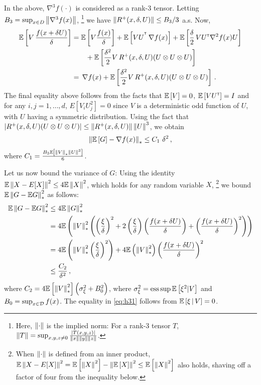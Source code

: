 In the above, $\nabla^3 f(\cdot)$ is considered as a rank-3 tensor.
Letting $B_3 = \sup_{x\in D} \left\| \nabla^3 f(x) \right\|$,%
\footnote{Here, $\left\|\cdot\right\|$ is the implied norm: For a rank-3 tensor $T$, $\left\|T\right\| = \sup_{x,y,z\ne 0}
\frac{|T (x,y,z)|}{\left\|x\right\|\left\|y\right\|\left\|z\right\|}$.
}
we have $\left\| R^{+}(x,\delta,U)\right\| \le B_3/3$ a.s.
Now,
\begin{align*}
\mathbb{E}\left[V\, \dfrac{f(x+\delta U)}{\delta}\right]
&= \mathbb{E}\left[V \frac{f(x)}{\delta}\right] +  \mathbb{E}\left[VU^{^\mathsf{\scriptscriptstyle T}}
\, \nabla f(x)\right]  + \mathbb{E}\left[\frac{\delta}{2}\, V U^\mathsf{\scriptscriptstyle T} \nabla^2 f(x) U\right] \\
&\qquad+   \mathbb{E}\left[\frac{\delta^2}{2}  V \,R^{+}(x,\delta,U)(U \otimes U \otimes U)\right]
\\
&= \, \nabla f(x)  + \mathbb{E}\left[\frac{\delta^2}{2}  V \,R^{+}(x,\delta,U)(U \otimes U \otimes U)\right]\,.
\end{align*}
The final equality above follows from the facts that $\mathbb{E}\left[V\right] = 0$, $\mathbb{E}\left[V U^\mathsf{\scriptscriptstyle T}\right] = I$ and for any $i,j=1,\ldots,d$, $E[V_i U_j^2] = 0$ since $V$ is a deterministic odd function of $U$, with $U$ having a symmetric distribution.
Using the fact that $|R^{+}(x,\delta,U) (U \otimes U \otimes U)| \le
\left\|R^{+}(x,\delta,U)\right\| \left\|U\right\|^3$,
we obtain
\begin{align*}
\left\| \mathbb{E}\left[ G \right] - \nabla f(x) \right\|_*
\le C_1\,\, \delta^2 \,,
\end{align*}
where $C_1 = \frac{B_3 \mathbb{E}\left[ \left\|V\right\|_* \left\|U\right\|^3 \right]}{6}$.

Let us now bound the variance of $G$:
Using the identity $\mathbb{E}\left\|X -  E[X]\right\|^2 \le 4 \mathbb{E} \left\|X\right\|^2$, which holds for any random variable $X$,%
\footnote{When $\left\|\cdot\right\|$ is defined from an inner product,
$\mathbb{E}\left\|X -  E[X]\right\|^2 = \mathbb{E}\left[\left\|X\right\|^2\right] - \left\|\mathbb{E}\left[X\right]\right\|^2 \le \mathbb{E}\left[\left\|X\right\|^2\right]$ also holds, shaving off a factor of four from the inequality below.}
we bound $\mathbb{E}\left\| G - \mathbb{E} G\right\|_*^2$ as follows:
\begin{align}
\mathbb{E}\left\| G - \mathbb{E} G\right\|_*^2
 &\le 4 \mathbb{E} \left\|G\right\|_*^2 \nonumber \\
& =  4\mathbb{E}\left( \left\| V \right\|_*^2 \left(\left(\dfrac{\xi}{\delta}\right)^2  + 2 \left(\dfrac{\xi}{\delta}\right) \left(\dfrac{f(x+\delta U)}{\delta}\right)
+ \left( \dfrac{f(x+\delta U) }{\delta} \right)^2 \right)\right) \nonumber \\
&=  4\mathbb{E}\left( \left\| V \right\|_*^2 \left(\dfrac{\xi}{\delta}\right)^2\right)
+ 4 \mathbb{E} \left(\left\| V \right\|_*^2 \right)\left( \dfrac{f(x+\delta U) }{\delta} \right)^2  \label{eq:h31} \\
& \le  \frac{C_2}{\delta^2}\,, \nonumber \label{eq:h41}
\end{align}
where $C_2 = 4 \mathbb{E}\left[\left\|V\right\|_*^2\right]\left( \sigma_\xi^2+B_0^2\right)$, where
$\sigma_\xi^2 = \operatorname{ess\,sup} \mathbb{E}\left[\xi^2|V\right]$ and $B_0 = \sup_{x\in \mathcal{D}} f(x)$.
The equality in \eqref{eq:h31} follows from $\mathbb{E}\left[ \xi \,|\, V \right] = 0$.

